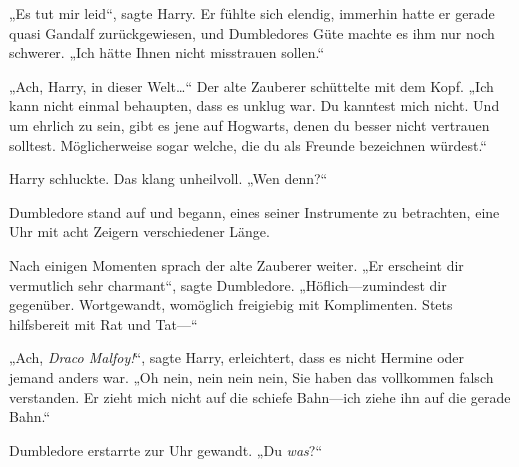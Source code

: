 „Es tut mir leid“, sagte Harry. Er fühlte sich elendig, immerhin hatte er gerade quasi Gandalf zurückgewiesen, und Dumbledores Güte machte es ihm nur noch schwerer. „Ich hätte Ihnen nicht misstrauen sollen.“

„Ach, Harry, in dieser Welt…“ Der alte Zauberer schüttelte mit dem Kopf. „Ich kann nicht einmal behaupten, dass es unklug war. Du kanntest mich nicht. Und um ehrlich zu sein, gibt es jene auf Hogwarts, denen du besser nicht vertrauen solltest. Möglicherweise sogar welche, die du als Freunde bezeichnen würdest.“

Harry schluckte. Das klang unheilvoll. „Wen denn?“

Dumbledore stand auf und begann, eines seiner Instrumente zu betrachten, eine Uhr mit acht Zeigern verschiedener Länge.

Nach einigen Momenten sprach der alte Zauberer weiter. „Er erscheint dir vermutlich sehr charmant“, sagte Dumbledore. „Höflich—zumindest dir gegenüber. Wortgewandt, womöglich freigiebig mit Komplimenten. Stets hilfsbereit mit Rat und Tat—“

„Ach, \emph{Draco Malfoy!}“, sagte Harry, erleichtert, dass es nicht Hermine oder jemand anders war. „Oh nein, nein nein nein, Sie haben das vollkommen falsch verstanden. Er zieht mich nicht auf die schiefe Bahn—ich ziehe ihn auf die gerade Bahn.“

Dumbledore erstarrte zur Uhr gewandt. „Du \emph{was}?“

